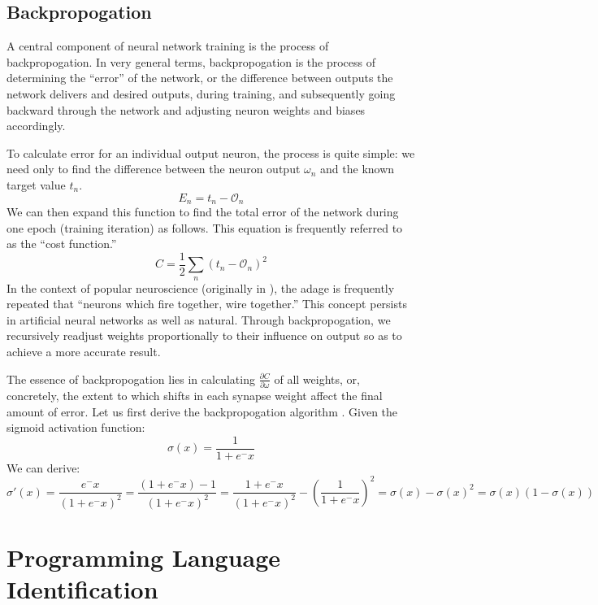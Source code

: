 \documentclass{article}
\begin{document}
\subsection{Backpropogation}
A central component of neural network training is the process of backpropogation. In very general terms, backpropogation is the process of determining the ``error'' of the network, or the difference between outputs the network delivers and desired outputs, during training, and subsequently going backward through the network and adjusting neuron weights and biases accordingly.

To calculate error for an individual output neuron, the process is quite simple: we need only to find the difference between the neuron output $\omega_n$ and the known target value $t_n$.
$$E_n=t_n-\mathcal{O}_n$$
We can then expand this function to find the total error of the network during one epoch (training iteration) as follows. This equation is frequently referred to as the ``cost function.'' \cite{mediummlbasics}
$$C=\frac{1}{2}\sum_n(t_n-\mathcal{O}_n)^2$$
In the context of popular neuroscience (originally in \cite{neuronsfire}), the adage is frequently repeated that ``neurons which fire together, wire together.'' This concept persists in artificial neural networks as well as natural. Through backpropogation, we recursively readjust weights proportionally to their influence on output so as to achieve a more accurate result.

The essence of backpropogation lies in calculating $\frac{\partial{C}}{\partial{\omega}}$ of all weights, or, concretely, the extent to which shifts in each synapse weight affect the final amount of error. Let us first derive the backpropogation algorithm \cite{derivebackprop}. Given the sigmoid activation function:
$$\sigma(x)=\frac{1}{1+e^-x}$$
We can derive:
$$\sigma'(x)=\frac{e^-x}{(1+e^-x)^2}=\frac{(1+e^-x)-1}{(1+e^-x)^2}=\frac{1+e^-x}{(1+e^-x)^2}-\left(\frac{1}{1+e^-x}\right)^2=\sigma(x)-\sigma(x)^2=\sigma(x)(1-\sigma(x))$$

\section{Programming Language Identification}
\end{document}
